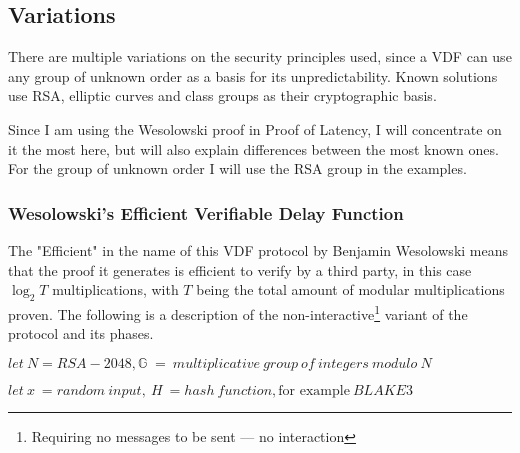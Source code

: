 \subsection{Variations}
There are multiple variations on the security principles used, since a VDF can use any group of unknown order as a basis for its unpredictability. Known solutions use RSA, elliptic curves and class groups as their cryptographic basis.

Since I am using the Wesolowski proof in Proof of Latency, I will concentrate on it the most here, but will also explain differences between the most known ones. For the group of unknown order I will use the RSA group in the examples.

\subsubsection{Wesolowski's Efficient Verifiable Delay Function}
The "Efficient" in the name of this VDF protocol by Benjamin Wesolowski means that the proof it generates is efficient to verify by a third party, in this case \( \log _{2} T \) multiplications, with \( T \) being the total amount of modular multiplications proven. The following is a description of the non-interactive\footnote{Requiring no messages to be sent --- no interaction} variant of the protocol and its phases.

\( let \: N = RSA-2048, \mathbb{G} \; = \: multiplicative \: group \: of \: integers \: modulo \: N \)

\( let \: x \: = random \: input,  \: H \: = hash \: function, \text{for example} \: BLAKE3 \)

